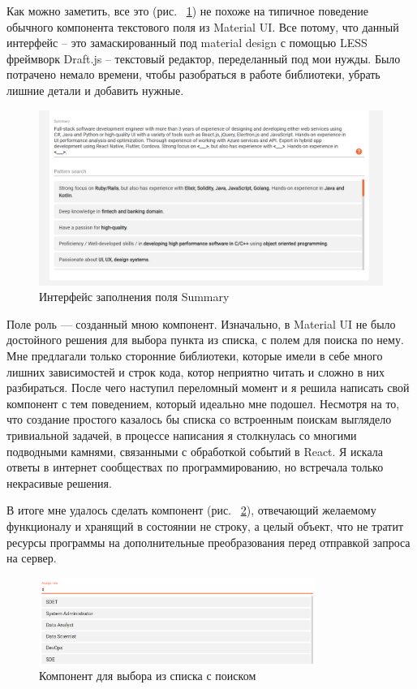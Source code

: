\documentclass[a4paper,12pt]{diplom}
\begin{document}
Как можно заметить, все это (рис. ~\ref{7}) не похоже на типичное поведение обычного компонента текстового поля из Material UI. Все потому, что данный интерфейс -- это
замаскированный под material design с помощью LESS фреймворк Draft.js -- текстовый редактор, переделанный под мои нужды. Было потрачено немало времени, чтобы разобраться в работе библиотеки,
убрать лишние детали и добавить нужные.

\begin{figure}[!ht]
\centering
\includegraphics[width=1\textwidth]{resources/summary.png}
\caption{Интерфейс заполнения поля Summary}
\label{7}
\end{figure}

Поле роль — созданный мною компонент. Изначально, в Material UI не было достойного решения для выбора пункта из списка, с полем для поиска по нему.
Мне предлагали только сторонние библиотеки, которые имели в себе много лишних зависимостей и строк кода, котор неприятно читать и сложно в них разбираться.
После чего наступил переломный момент и я решила написать свой компонент с тем поведением, который идеально мне подошел. Несмотря на то, что создание простого казалось бы списка со встроенным поискам выглядело тривиальной задачей,
в процессе написания я столкнулась со многими подводными камнями, связанными с обработкой событий в React. Я искала ответы в интернет сообществах по программированию,
но встречала только некрасивые решения.

В итоге мне удалось сделать компонент (рис. ~\ref{8}), отвечающий желаемому функционалу и хранящий в состоянии не строку, а целый объект, что
не тратит ресурсы программы на дополнительные преобразования перед отправкой запроса на сервер.

\begin{figure}[!ht]
\centering
\includegraphics[width=0.8\textwidth]{resources/role.png}
\caption{Компонент для выбора из списка с поиском}
\label{8}
\end{figure}
\end{document}
